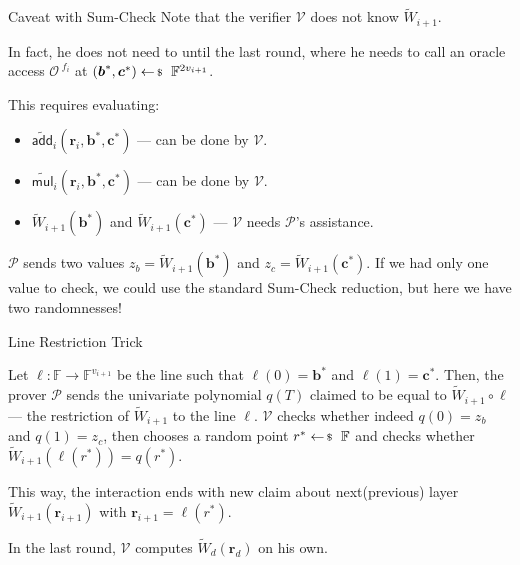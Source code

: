 \documentclass{zkdl-presentation-template}
\begin{document}
    \begin{frame}{Caveat with Sum-Check}
        Note that the verifier $\mathcal{V}$ does not know $\widetilde{W}_{i+1}$.

        In fact, he does not need to until the last round, where he needs to
        call an oracle access $\mathcal{O}^{\; f_i}$ at $(\boldsymbol{b}^*,
        \boldsymbol{c}^*) \leftarrowS \mathbb{F}^{2v_{i+1}}$.
        \pause

        This requires evaluating:
        \begin{itemize}
            \item $\widetilde{\mathsf{add}}_i(\mathbf{r}_i,\boldsymbol{b}^*, \boldsymbol{c}^*)$ --- can be done by $\mathcal{V}$.\pause
            \item $\widetilde{\mathsf{mul}}_i(\mathbf{r}_i,\boldsymbol{b}^*, \boldsymbol{c}^*)$ --- can be done by $\mathcal{V}$.\pause
            \item $\widetilde{W}_{i+1}(\boldsymbol{b}^*)$ and $\widetilde{W}_{i+1}(\boldsymbol{c}^*)$ --- $\mathcal{V}$ needs $\mathcal{P}$'s assistance.
        \end{itemize}
        \pause

        $\mathcal{P}$ sends two values $z_b =
        \widetilde{W}_{i+1}(\boldsymbol{b}^*)$ and $z_c =
        \widetilde{W}_{i+1}(\boldsymbol{c}^*)$.  If we had only one value to
        check, we could use the standard Sum-Check reduction, but here we have
        two randomnesses!
    \end{frame}

    \begin{frame}{Line Restriction Trick}
        \begin{proposition}
            Let $\ell: \mathbb{F} \to \mathbb{F}^{v_{i+1}}$ be the line such that
            $\ell(0)=\boldsymbol{b}^*$ and $\ell(1)=\boldsymbol{c}^*$. Then, the prover
            $\mathcal{P}$ sends the univariate polynomial $q(T)$ claimed to be equal to
            $\widetilde{W}_{i+1} \circ \ell$ --- the restriction of
            $\widetilde{W}_{i+1}$ to the line $\ell$. $\mathcal{V}$ checks whether
            indeed $q(0)=z_b$ and $q(1)=z_c$, then chooses a random point
            $r^* \leftarrowS \mathbb{F}$ and checks whether
            $\widetilde{W}_{i+1}(\ell(r^*)) = q(r^*)$.
        \end{proposition}
        \pause

        This way, the interaction ends with new claim about next(previous) layer
        $\widetilde{W}_{i+1}(\mathbf{r}_{i+1})$ with
        $\mathbf{r}_{i+1}=\ell(r^*)$.
        \pause

        In the last round, $\mathcal{V}$ computes
        $\widetilde{W}_d(\mathbf{r}_d)$ on his own.
    \end{frame}
\end{document}
